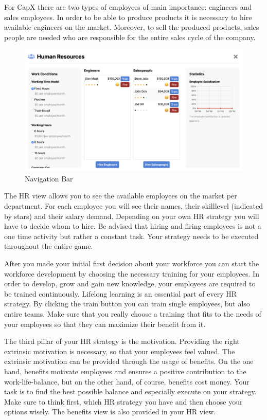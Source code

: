 For CapX there are two types of employees of main importance: engineers and sales employees. In order to be able to produce products it is necessary to hire available engineers on the market. Moreover, to sell the produced products, sales people are needed who are responsible for the entire sales cycle of the company.

\begin{figure} [!htbp]
    \centering
    \includegraphics [width=\textwidth]{HR/hr_view.png}
    \caption{Navigation Bar}
    \label{fig:navigationBar}
\end{figure}

The HR view allows you to see the available employees on the market per department. For each employee you will see their names, their skilllevel (indicated by stars) and their salary demand. Depending on your own HR strategy you will have to decide whom to hire. Be advised that hiring and firing employees is not a one time activity but rather a constant task. Your strategy needs to be executed throughout the entire game.

After you made your initial first decision about your workforce you can start the workforce development by choosing the necessary training for your employees. In order to develop, grow and gain new knowledge, your employees are required to be trained continuously. Lifelong learning is an essential part of every HR strategy. By clicking the train button you can train single employees, but also entire teams. Make sure that you really choose a training that fits to the needs of your employees so that they can maximize their benefit from it.

The third pillar of your HR strategy is the motivation. Providing the right extrinsic motivation is necessary, so that your employees feel valued. The extrinsic motivation can be provided through the usage of benefits. On the one hand, benefits motivate employees and ensures a positive contribution to the work-life-balance, but on the other hand, of course, benefits cost money. Your task is to find the best possible balance and especially execute on your strategy. Make sure to think first, which HR strategy you have and then choose your options wisely. The benefits view is also provided in your HR view.